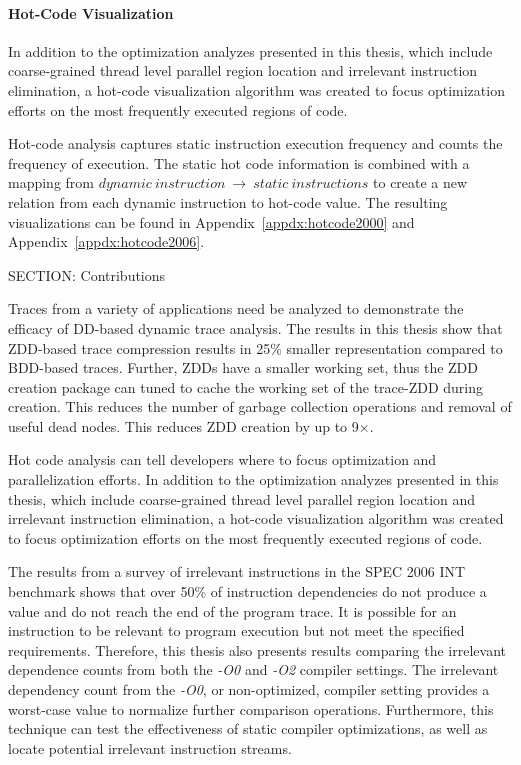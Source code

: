 {\noindent\paragraph{Hot-Code Visualization}

In addition to the optimization analyzes presented in this thesis, which include coarse-grained thread level parallel region location and irrelevant instruction elimination, a hot-code visualization algorithm was created to focus optimization efforts on the most frequently executed regions of code.

Hot-code analysis captures static instruction execution frequency and counts the frequency of execution.  The static hot code information is combined with a mapping from $dynamic\ instruction \ \rightarrow \ static\ instructions$ to create a new relation from each dynamic instruction to hot-code value.  The resulting visualizations can be found in Appendix~\ref{appdx:hotcode2000} and Appendix~\ref{appdx:hotcode2006}.

SECTION: Contributions


Traces from a variety of applications need be analyzed to demonstrate the efficacy of DD-based dynamic trace analysis. The results in this thesis show that ZDD-based trace compression results in 25\% smaller representation compared to BDD-based traces.  Further, ZDDs have a smaller working set, thus the ZDD creation package can tuned to cache the working set of the trace-ZDD during creation.  This reduces the number of garbage collection operations and removal of useful dead nodes. This reduces ZDD creation by up to 9$\times$.

Hot code analysis can tell developers where to focus optimization and parallelization efforts. In addition to the optimization analyzes presented in this thesis, which include coarse-grained thread level parallel region location and irrelevant instruction elimination, a hot-code visualization algorithm was created to focus optimization efforts on the most frequently executed regions of code.

The results from a survey of irrelevant instructions in the SPEC 2006 INT benchmark shows that over 50\% of instruction dependencies do not produce a value and do not reach the end of the program trace.  It is possible for an instruction to be relevant to program execution but not meet the specified requirements.  Therefore, this thesis also presents results comparing the irrelevant dependence counts from both the \textit{-O0} and \textit{-O2} compiler settings. The irrelevant dependency count from the \textit{-O0}, or non-optimized, compiler setting provides a worst-case value to normalize further comparison operations.  Furthermore, this technique can test the effectiveness of static compiler optimizations, as well as locate potential irrelevant instruction streams.

}
